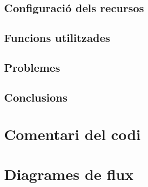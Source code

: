 \documentclass[12pt,a4paper]{article}
\begin{document}
\subsection{Configuració dels recursos}

\subsection{Funcions utilitzades}

\subsection{Problemes}

\subsection{Conclusions}

\section{Comentari del codi}

\section{Diagrames de flux}
\end{document}
